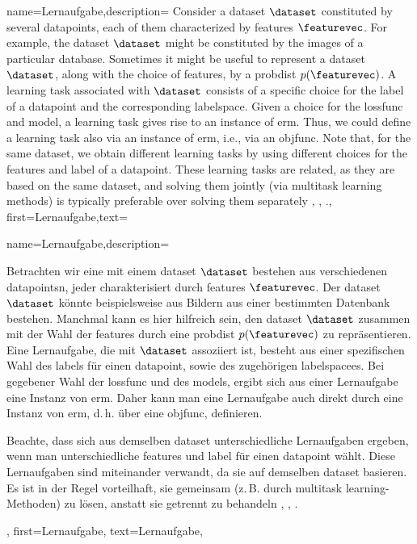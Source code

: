 {{{{
{name={Lernaufgabe},description=
	{Consider a \gls{dataset} $\dataset$ constituted by several \gls{datapoint}s, each of them 
		characterized by \gls{feature}s $\featurevec$. For example, the \gls{dataset} $\dataset$ 
		might be constituted by the images of a particular database. Sometimes it might be useful 
		to represent a \gls{dataset} $\dataset$, along with the choice of \gls{feature}s, by a \gls{probdist} $p(\featurevec)$. 
		A learning task associated with $\dataset$ consists of a specific 
		choice for the \gls{label} of a \gls{datapoint} and the corresponding \gls{labelspace}. 
		Given a choice for the \gls{lossfunc} and \gls{model}, a learning task gives rise to an 
		instance of \gls{erm}. Thus, we could define a learning task also via an instance of \gls{erm}, i.e., 
		via an \gls{objfunc}. Note that, for the same \gls{dataset}, we obtain different learning tasks by using 
		different choices for the \gls{feature}s and \gls{label} of a \gls{datapoint}. These learning 
		tasks are related, as they are based on the same \gls{dataset}, and solving them jointly 
		(via \gls{multitask learning} methods) is typically preferable over solving them separately \cite{Caruana:1997wk}, \cite{JungGaphLassoSPL}, \cite{CSGraphSelJournal}.},
	first={Lernaufgabe},text={{name={Lernaufgabe},description=
			{Betrachten wir eine   mit einem  \gls{dataset} $\dataset$ bestehen aus verschiedenen  \glspl{datapoint}n, jeder charakterisiert durch  \glspl{feature}  $\featurevec$. 
				Der \gls{dataset} $\dataset$  könnte beispielsweise aus Bildern aus einer bestimmten Datenbank bestehen. 
				Manchmal kann es hier hilfreich sein, den  \gls{dataset} $\dataset$ zusammen mit der Wahl der  \glspl{feature} durch eine  \gls{probdist} $p(\featurevec)$ zu repräsentieren. 
				Eine Lernaufgabe, die mit  $\dataset$ assoziiert ist, besteht aus einer spezifischen Wahl des \gls{label}s für einen \gls{datapoint}, sowie des zugehörigen  \gls{labelspace}es. 
				Bei gegebener Wahl der  \gls{lossfunc} und des \gls{model}s, ergibt sich aus einer Lernaufgabe eine Instanz 
				von \gls{erm}. Daher kann man eine Lernaufgabe auch direkt durch eine Instanz von \gls{erm}, 
				d. h. über eine \gls{objfunc}, definieren.
				
				Beachte, dass sich aus demselben \gls{dataset} unterschiedliche Lernaufgaben ergeben, wenn man 
				unterschiedliche \gls{feature}s und \gls{label} für einen \gls{datapoint} wählt. 
				Diese Lernaufgaben sind miteinander verwandt, da sie auf demselben \gls{dataset} basieren. 
				Es ist in der Regel vorteilhaft, sie gemeinsam (z. B. durch \gls{multitask learning}-Methoden) 
				zu lösen, anstatt sie getrennt zu behandeln \cite{Caruana:1997wk}, \cite{JungGaphLassoSPL}, \cite{CSGraphSelJournal}.
				},
				first={Lernaufgabe},
				text={Lernaufgabe},

}}}}}}}
